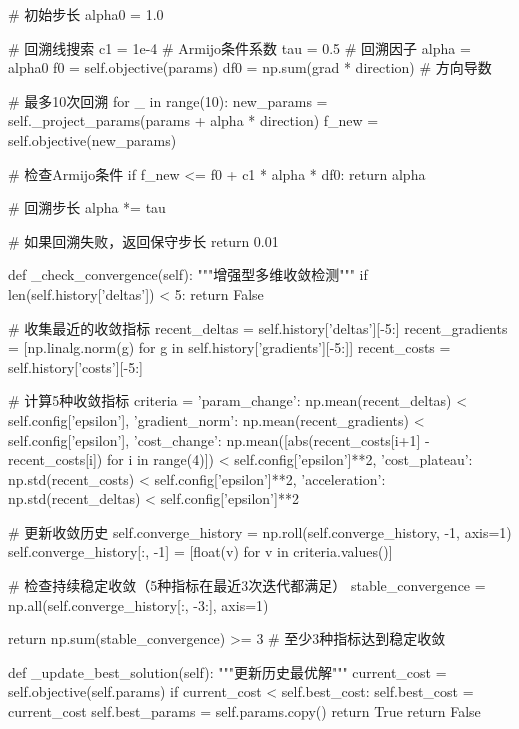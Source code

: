 \documentclass[a4paper,12pt]{article}
\begin{document}
\begin{python}
        # 初始步长
        alpha0 = 1.0
        
        # 回溯线搜索
        c1 = 1e-4  # Armijo条件系数
        tau = 0.5   # 回溯因子
        alpha = alpha0
        f0 = self.objective(params)
        df0 = np.sum(grad * direction)  # 方向导数
        
        # 最多10次回溯
        for _ in range(10):
            new_params = self._project_params(params + alpha * direction)
            f_new = self.objective(new_params)
            
            # 检查Armijo条件
            if f_new <= f0 + c1 * alpha * df0:
                return alpha
                
            # 回溯步长
            alpha *= tau
            
        # 如果回溯失败，返回保守步长
        return 0.01

    def _check_convergence(self):
        """增强型多维收敛检测"""
        if len(self.history['deltas']) < 5:
            return False

        # 收集最近的收敛指标
        recent_deltas = self.history['deltas'][-5:]
        recent_gradients = [np.linalg.norm(g) for g in self.history['gradients'][-5:]]
        recent_costs = self.history['costs'][-5:]
        
        # 计算5种收敛指标
        criteria = {
            'param_change': np.mean(recent_deltas) < self.config['epsilon'],
            'gradient_norm': np.mean(recent_gradients) < self.config['epsilon'],
            'cost_change': np.mean([abs(recent_costs[i+1] - recent_costs[i]) for i in range(4)]) < self.config['epsilon']**2,
            'cost_plateau': np.std(recent_costs) < self.config['epsilon']**2,
            'acceleration': np.std(recent_deltas) < self.config['epsilon']**2
        }
        
        # 更新收敛历史
        self.converge_history = np.roll(self.converge_history, -1, axis=1)
        self.converge_history[:, -1] = [float(v) for v in criteria.values()]
        
        # 检查持续稳定收敛（5种指标在最近3次迭代都满足）
        stable_convergence = np.all(self.converge_history[:, -3:], axis=1)
        
        return np.sum(stable_convergence) >= 3  # 至少3种指标达到稳定收敛

    def _update_best_solution(self):
        """更新历史最优解"""
        current_cost = self.objective(self.params)
        if current_cost < self.best_cost:
            self.best_cost = current_cost
            self.best_params = self.params.copy()
            return True
        return False


\end{python}
\end{document}
